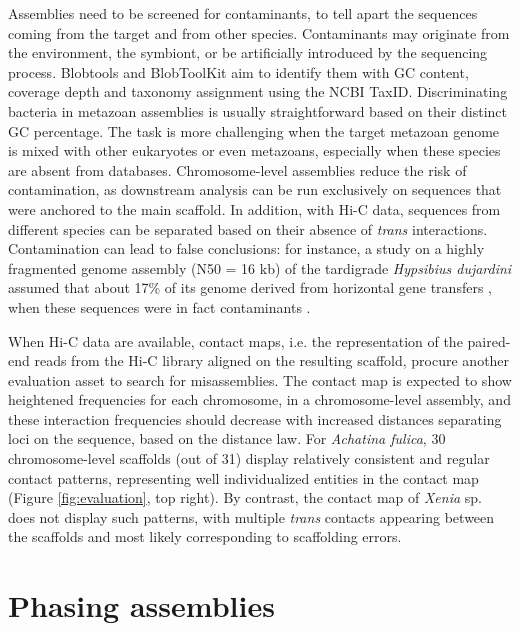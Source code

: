Assemblies need to be screened for contaminants, to tell apart the sequences coming from the target and from other species. Contaminants may originate from the environment, the symbiont, or be artificially introduced by the sequencing process. Blobtools \cite{blobtools} and BlobToolKit \cite{blobtoolkit} aim to identify them with GC content, coverage depth and taxonomy assignment using the NCBI TaxID. Discriminating bacteria in metazoan assemblies is usually straightforward based on their distinct GC percentage. The task is more challenging when the target metazoan genome is mixed with other eukaryotes or even metazoans, especially when these species are absent from databases. Chromosome-level assemblies reduce the risk of contamination, as downstream analysis can be run exclusively on sequences that were anchored to the main scaffold. In addition, with Hi-C data, sequences from different species can be separated based on their absence of \textit{trans} interactions. Contamination can lead to false conclusions: for instance, a study on a highly fragmented genome assembly (N50 = 16 kb) of the tardigrade \textit{Hypsibius dujardini} assumed that about 17\% of its genome derived from horizontal gene transfers \cite{hypsibius_dujardini1}, when these sequences were in fact contaminants \cite{hypsibius_dujardini2}. 

When Hi-C data are available, contact maps, i.e. the representation of the paired-end reads from the Hi-C library aligned on the resulting scaffold, procure another evaluation asset to search for misassemblies. The contact map is expected to show heightened frequencies for each chromosome, in a chromosome-level assembly, and these interaction frequencies should decrease with increased distances separating loci on the sequence, based on the distance law. For \textit{Achatina fulica}, 30 chromosome-level scaffolds (out of 31) display relatively consistent and regular contact patterns, representing well individualized entities in the contact map (Figure \ref{fig:evaluation}, top right). By contrast, the contact map of \textit{Xenia} sp. does not display such patterns, with multiple \textit{trans} contacts appearing between the scaffolds and most likely corresponding to scaffolding errors. \\

\section{Phasing assemblies}

